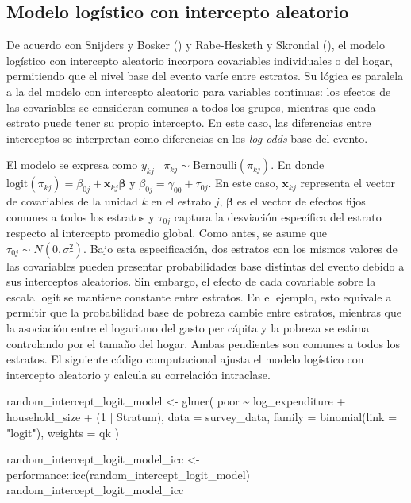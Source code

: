 \documentclass[
  spanish,
  11pt,
  letterpaper,
  oneside,
  open=any]{scrbook}
\newenvironment{Shaded}{\begin{snugshade}}{\end{snugshade}}
\newcommand{\AttributeTok}[1]{\textcolor[rgb]{0.40,0.45,0.13}{#1}}
\newcommand{\DecValTok}[1]{\textcolor[rgb]{0.68,0.00,0.00}{#1}}
\newcommand{\FunctionTok}[1]{\textcolor[rgb]{0.28,0.35,0.67}{#1}}
\newcommand{\NormalTok}[1]{\textcolor[rgb]{0.00,0.23,0.31}{#1}}
\newcommand{\OtherTok}[1]{\textcolor[rgb]{0.00,0.23,0.31}{#1}}
\newcommand{\SpecialCharTok}[1]{\textcolor[rgb]{0.37,0.37,0.37}{#1}}
\newcommand{\StringTok}[1]{\textcolor[rgb]{0.13,0.47,0.30}{#1}}
\begin{document}
\subsection{Modelo logístico con intercepto
aleatorio}\label{modelo-logistico-con-intercepto-aleatorio}

De acuerdo con Snijders y Bosker () y
Rabe-Hesketh y Skrondal
(), el modelo logístico
con intercepto aleatorio incorpora covariables individuales o del hogar,
permitiendo que el nivel base del evento varíe entre estratos. Su lógica
es paralela a la del modelo con intercepto aleatorio para variables
continuas: los efectos de las covariables se consideran comunes a todos
los grupos, mientras que cada estrato puede tener su propio intercepto.
En este caso, las diferencias entre interceptos se interpretan como
diferencias en los \emph{log-odds} base del evento.

El modelo se expresa como
\(y_{kj} \mid \pi_{kj} \sim \text{Bernoulli}(\pi_{kj})\). En donde
\(\text{logit}(\pi_{kj}) = \beta_{0j} + \mathbf{x}_{kj}\boldsymbol{\beta}\)
y \(\beta_{0j} = \gamma_{00} + \tau_{0j}\). En este caso,
\(\mathbf{x}_{kj}\) representa el vector de covariables de la unidad
\(k\) en el estrato \(j\), \(\boldsymbol{\beta}\) es el vector de
efectos fijos comunes a todos los estratos y \(\tau_{0j}\) captura la
desviación específica del estrato respecto al intercepto promedio
global. Como antes, se asume que
\(\tau_{0j} \sim N(0,\sigma_{\tau}^{2})\). Bajo esta especificación, dos
estratos con los mismos valores de las covariables pueden presentar
probabilidades base distintas del evento debido a sus interceptos
aleatorios. Sin embargo, el efecto de cada covariable sobre la escala
logit se mantiene constante entre estratos. En el ejemplo, esto equivale
a permitir que la probabilidad base de pobreza cambie entre estratos,
mientras que la asociación entre el logaritmo del gasto per cápita y la
pobreza se estima controlando por el tamaño del hogar. Ambas pendientes
son comunes a todos los estratos. El siguiente código computacional
ajusta el modelo logístico con intercepto aleatorio y calcula su
correlación intraclase.

\begin{Shaded}
\begin{Highlighting}[]
\NormalTok{random\_intercept\_logit\_model }\OtherTok{\textless{}{-}} \FunctionTok{glmer}\NormalTok{(}
\NormalTok{  poor }\SpecialCharTok{\textasciitilde{}}\NormalTok{ log\_expenditure }\SpecialCharTok{+}\NormalTok{ household\_size }\SpecialCharTok{+}\NormalTok{ (}\DecValTok{1} \SpecialCharTok{|}\NormalTok{ Stratum),}
  \AttributeTok{data =}\NormalTok{ survey\_data,}
  \AttributeTok{family =} \FunctionTok{binomial}\NormalTok{(}\AttributeTok{link =} \StringTok{"logit"}\NormalTok{),}
  \AttributeTok{weights =}\NormalTok{ qk}
\NormalTok{)}

\NormalTok{random\_intercept\_logit\_model\_icc }\OtherTok{\textless{}{-}}
\NormalTok{  performance}\SpecialCharTok{::}\FunctionTok{icc}\NormalTok{(random\_intercept\_logit\_model)}
\NormalTok{random\_intercept\_logit\_model\_icc}
\end{Highlighting}
\end{Shaded}
\end{document}
